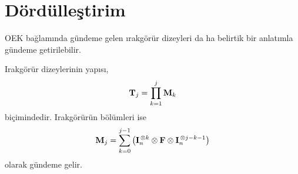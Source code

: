 \documentclass[a4paper,10pt]{article}
\begin{document}
\section{D\"ord\"ulle\c{s}tirim}

OEK ba\u{g}lam\i nda g\"undeme gelen \i rakg\"or\"ur dizeyleri da%
ha belirtik bir anlat\i mla g\"undeme getirilebilir. %

Irakg\"or\"ur dizeylerinin yap\i s{\i}, %
\begin{equation}
{\bf T}_j=\prod_{k=1}^j{\bf M}_k
\end{equation}
bi\c{c}imindedir. Irakg\"or\"ur\"un b\"ol\"umleri ise %
\begin{equation}
{\bf M}_j=\sum_{k=0}^{j-1}\left({\bf I}_n^{\,\otimes k}%
\otimes{\bf F}\otimes{\bf I}_n^{\,\otimes j-k-1}\right) 
\end{equation}
olarak g\"undeme gelir. %
\end{document}
